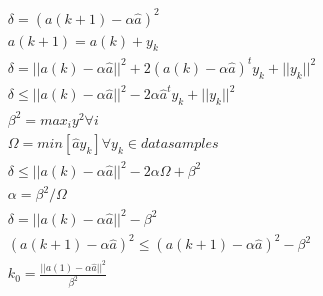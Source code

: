 \documentclass[a4paper,12pt]{article}
\begin{document}
\vspace{30pt}
\begin{eqnarray*}
\delta = (a(k + 1) - \alpha \hat{a})^2 \\
a(k+1) = a(k) + y_k \\
\delta = ||a(k) - \alpha \hat{a}||^2 + 2 ( a(k) - \alpha \hat{a} )^ty_k + ||y_k||^2 \\
\delta \leq ||a(k) - \alpha \hat{a}||^2 - 2\alpha \hat{a}^ty_k + ||y_k||^2 \\
\beta^2 = max_i y^2     \forall i \\
\Omega  = min [\hat{a} y_k] \forall y_k \in datasamples\\
\delta \leq ||a(k) - \alpha \hat{a}||^2 - 2\alpha \Omega + \beta^2 \\
\alpha = \beta^2 / \Omega \\
\delta = ||a(k) - \alpha \hat{a}||^2 - \beta^2 \\
(a(k + 1) - \alpha \hat{a})^2 \leq (a(k + 1) - \alpha \hat{a})^2 -\beta^2\\
k_0=\frac{||a(1) - \alpha \hat{a}||^2}{\beta^2}\\
\end{eqnarray*}
\end{document}
